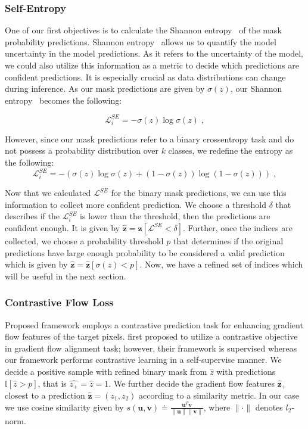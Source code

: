 \subsubsection{Self-Entropy}
One of our first objectives is to calculate the Shannon entropy~\cite{shannon1948mathematical} of the mask probability predictions. Shannon entropy~\cite{shannon1948mathematical} allows us to quantify the model uncertainty in the model predictions. As it refers to the uncertainty of the model, we could also utilize this information as a metric to decide which predictions are confident predictions. It is especially crucial as data distributions can change during inference. As our mask predictions are given by $\sigma(z)$, our Shannon entropy~\cite{shannon1948mathematical} becomes the following:

\begin{equation}
    \mathcal{L}_i^{SE} = -\sigma(z) \log \sigma(z) \; ,
\end{equation}

However, since our mask predictions refer to a binary crossentropy task and do not possess a probability distribution over $k$ classes, we redefine the entropy as the following:
\begin{equation}
    \mathcal{L}_i^{SE} = -(\sigma(z) \log \sigma(z) + (1-\sigma(z)) \log (1-\sigma(z))) \; ,
\end{equation}

Now that we calculated $\mathcal{L}^{SE}$ for the binary mask predictions, we can use this information to collect more confident prediction. We choose a threshold $\delta$ that describes if the $\mathcal{L}_i^{SE}$ is lower than the threshold, then the predictions are confident enough. It is given by $\hat{\bm{z}} = \bm{z}[\mathcal{L}^{SE}<\delta]$. Further, once the indices are collected, we choose a probability threshold $p$ that determines if the original predictions have large enough probability to be considered a valid prediction which is given by $\hat{\bm{z}} = \hat{\bm{z}}[\sigma(z)<p]$. Now, we have a refined set of indices which will be useful in the next section. 

\subsubsection{Contrastive Flow Loss}
Proposed framework employs a contrastive prediction task for enhancing gradient flow features of the target pixels. \cite{keaton2023celltranspose} first proposed to utilize a contrastive objective in gradient flow alignment task; however, their framework is supervised whereas our framework performs contrastive learning in a self-supervise manner. We decide a positive sample with refined binary mask from  $\hat{z}$ with predictions $\mathbb{I}[\hat{z}>p]$, that is $\hat{z_+}=\hat{z}=1$. We further decide the gradient flow features $\hat{\bm{z}}_+$ closest to a prediction  $\hat{\bm{z}} = (z_1,z_2)$ according to a similarity metric. In our case we use cosine similarity given by $s(\bm{u},\bm{v})\doteq\frac{\bm{u}^T\bm{v}}{\| \bm{u} \| \| \bm{v}\| }$, where $\| \cdot \|$ denotes $l_2$-norm.  


